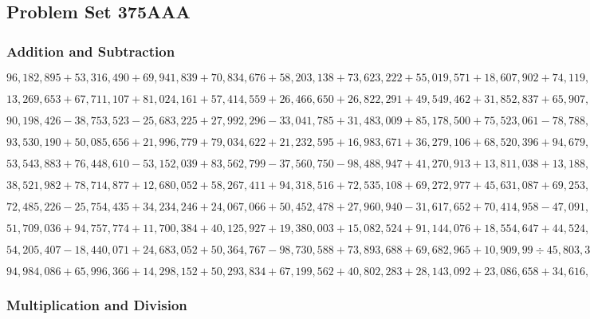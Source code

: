 \hypertarget{problem-set-375aaa}{%
\subsection{Problem Set 375AAA}\label{problem-set-375aaa}}

\hypertarget{addition-and-subtraction}{%
\subsubsection{Addition and
Subtraction}\label{addition-and-subtraction}}

\(96,182,895+53,316,490+69,941,839+70,834,676+58,203,138+73,623,222+55,019,571+18,607,902+74,119,884+32,830,117\)

\(13,269,653+67,711,107+81,024,161+57,414,559+26,466,650+26,822,291+49,549,462+31,852,837+65,907,939+25,743,207\)

\(90,198,426-38,753,523-25,683,225+27,992,296-33,041,785+31,483,009+85,178,500+75,523,061-78,788,749+74,133,536\)

\(93,530,190+50,085,656+21,996,779+79,034,622+21,232,595+16,983,671+36,279,106+68,520,396+94,679,500+78,308,102\)

\(53,543,883+76,448,610-53,152,039+83,562,799-37,560,750-98,488,947+41,270,913+13,811,038+13,188,310-91,634,297\)

\(38,521,982+78,714,877+12,680,052+58,267,411+94,318,516+72,535,108+69,272,977+45,631,087+69,253,110+62,655,064\)

\(72,485,226-25,754,435+34,234,246+24,067,066+50,452,478+27,960,940-31,617,652+70,414,958-47,091,450-55,013,467\)

\(51,709,036+94,757,774+11,700,384+40,125,927+19,380,003+15,082,524+91,144,076+18,554,647+44,524,183+76,353,839\)

\(54,205,407-18,440,071+24,683,052+50,364,767-98,730,588+73,893,688+69,682,965+10,909,99÷45,803,30÷63,841,786\)

\(94,984,086+65,996,366+14,298,152+50,293,834+67,199,562+40,802,283+28,143,092+23,086,658+34,616,049+82,999,119\)

\hypertarget{multiplication-and-division}{%
\subsubsection{Multiplication and
Division}\label{multiplication-and-division}}


